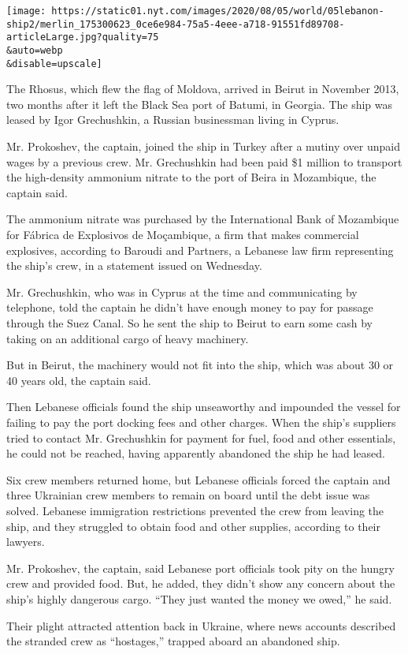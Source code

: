 \texttt{[image: https://static01.nyt.com/images/2020/08/05/world/05lebanon-ship2/merlin\_175300623\_0ce6e984-75a5-4eee-a718-91551fd89708-articleLarge.jpg?quality=75\\\&auto=webp\\\&disable=upscale]}

The Rhosus, which flew the flag of Moldova, arrived in Beirut in
November 2013, two months after it left the Black Sea port of Batumi, in
Georgia. The ship was leased by Igor Grechushkin, a Russian businessman
living in Cyprus.

Mr. Prokoshev, the captain, joined the ship in Turkey after a mutiny
over unpaid wages by a previous crew. Mr. Grechushkin had been paid \$1
million to transport the high-density ammonium nitrate to the port of
Beira in Mozambique, the captain said.

The ammonium nitrate was purchased by the International Bank of
Mozambique for Fábrica de Explosivos de Moçambique, a firm that makes
commercial explosives, according to Baroudi and Partners, a Lebanese law
firm representing the ship's crew, in a statement issued on Wednesday.

Mr. Grechushkin, who was in Cyprus at the time and communicating by
telephone, told the captain he didn't have enough money to pay for
passage through the Suez Canal. So he sent the ship to Beirut to earn
some cash by taking on an additional cargo of heavy machinery.

But in Beirut, the machinery would not fit into the ship, which was
about 30 or 40 years old, the captain said.

Then Lebanese officials found the ship unseaworthy and impounded the
vessel for failing to pay the port docking fees and other charges. When
the ship's suppliers tried to contact Mr. Grechushkin for payment for
fuel, food and other essentials, he could not be reached, having
apparently abandoned the ship he had leased.

Six crew members returned home, but Lebanese officials forced the
captain and three Ukrainian crew members to remain on board until the
debt issue was solved. Lebanese immigration restrictions prevented the
crew from leaving the ship, and they struggled to obtain food and other
supplies, according to their lawyers.

Mr. Prokoshev, the captain, said Lebanese port officials took pity on
the hungry crew and provided food. But, he added, they didn't show any
concern about the ship's highly dangerous cargo. ``They just wanted the
money we owed,'' he said.

Their plight attracted attention back in Ukraine, where news accounts
described the stranded crew as ``hostages,'' trapped aboard an abandoned
ship.

